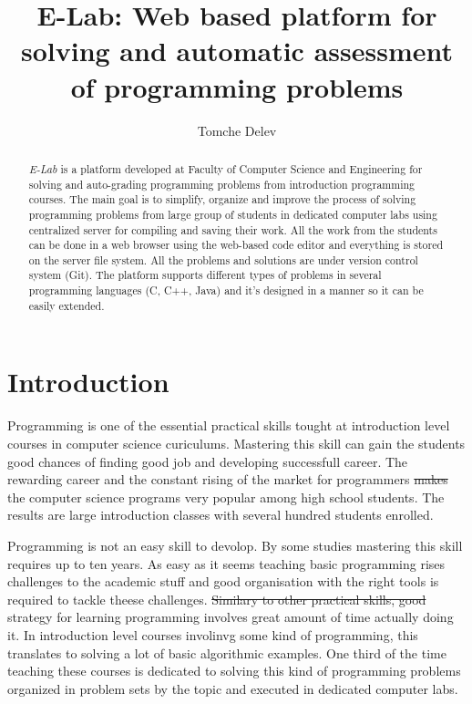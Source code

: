 \documentclass{article}
\providecommand{\DIFadd}[1]{{\protect\color{blue}\uwave{#1}}} %
\providecommand{\DIFdel}[1]{{\protect\color{red}\sout{#1}}}                      %
\providecommand{\DIFaddbegin}{} %
\providecommand{\DIFaddend}{} %
\providecommand{\DIFdelbegin}{} %
\providecommand{\DIFdelend}{} %
\begin{document}
\title{E-Lab: Web based platform for solving and automatic assessment of
programming problems}

\author{Tomche Delev}

\maketitle

\begin{abstract}

\emph{E-Lab} is a platform developed at Faculty of Computer Science and
Engineering for solving and auto-grading programming problems from introduction
programming courses. The main goal is to simplify, organize and
improve the process of solving programming problems from large group of
students in dedicated computer labs using centralized server for compiling and saving their
work. All the work from the students can be done in a web browser using the
web-based code editor and everything is stored on the server file system.
All the problems and solutions are under version control system (Git). The
platform supports different types of problems in several programming languages
(C, C++, Java) and it's designed in a manner so it can be easily extended. \DIFaddbegin \DIFadd{Here
we add some text.
}\DIFaddend \end{abstract}

\section{Introduction}
Programming is one of the essential practical skills tought at introduction
level courses in computer science curiculums. Mastering this skill can gain the
students good chances of finding good job and developing successfull career. The
rewarding career and the constant rising of the market for programmers \DIFdelbegin \DIFdel{makes }\DIFdelend \DIFaddbegin \DIFadd{defines
}\DIFaddend the computer science programs very popular among high school students. The results
are large introduction classes with several hundred students enrolled. 

Programming is not an easy skill to devolop. By some studies
\cite{winslow1996programming} mastering this skill requires up to ten years. As
easy as it seems teaching basic programming rises challenges to the academic
stuff and good organisation with the right tools is required to tackle theese
challenges. \DIFdelbegin \DIFdel{Similary to other practical skills, good }\DIFdelend \DIFaddbegin \DIFadd{Good }\DIFaddend strategy for learning
programming involves great amount of time actually doing it. In introduction
level courses involinvg some kind of programming, this translates to solving a
lot of basic algorithmic examples. One third of the time teaching these courses
is dedicated to solving this kind of programming problems organized in problem sets by the
topic and executed in dedicated computer labs.
\end{document}
